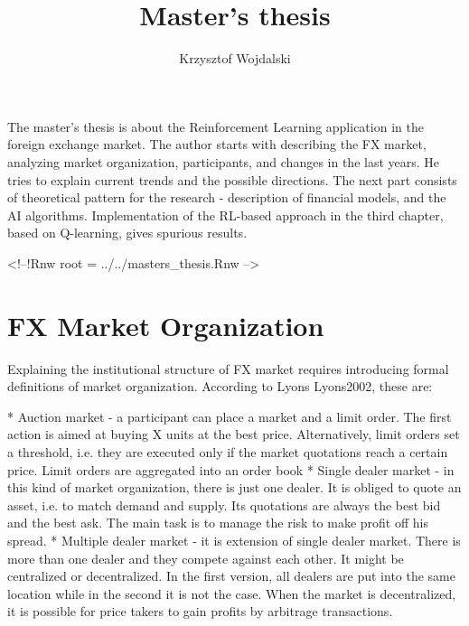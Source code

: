 \documentclass{article}\usepackage[]{graphicx}\usepackage[]{color}
\begin{document}
\title{Master's thesis}
\author{Krzysztof Wojdalski}
\maketitle




The master's thesis is about the Reinforcement Learning application in the foreign exchange market.
The author starts with describing the FX market, analyzing market organization, participants, and changes in the last
years. He tries to explain current trends and the possible directions.
The next part consists of theoretical pattern for the research - description of financial models,
and the AI algorithms.
Implementation of the RL-based approach in the third chapter, based on Q-learning, gives spurious results.












<!--!Rnw root = ../../masters\_thesis.Rnw -->


\section{FX Market Organization}

Explaining the institutional structure of FX market requires introducing formal definitions of market organization. According to Lyons Lyons2002, these are:

* Auction market - a participant can place a market and a limit order. The first action is aimed at buying X units at the best price. Alternatively, limit orders set a threshold, i.e. they are executed only if the market quotations reach a certain price. Limit orders are aggregated into an order book
* Single dealer market - in this kind of market organization, there is just one dealer. It is obliged to quote an asset, i.e. to match demand and supply. Its quotations are always the best bid and the best ask. The main task is to manage the risk to make profit off his spread.
* Multiple dealer market - it is extension of single dealer market. There is more than one dealer and they compete against each other. It might be centralized or decentralized. In the first version, all dealers are put into the same location while in the second it is not the case. When the market is decentralized, it is possible for price takers to gain profits by arbitrage transactions.
\end{document}
